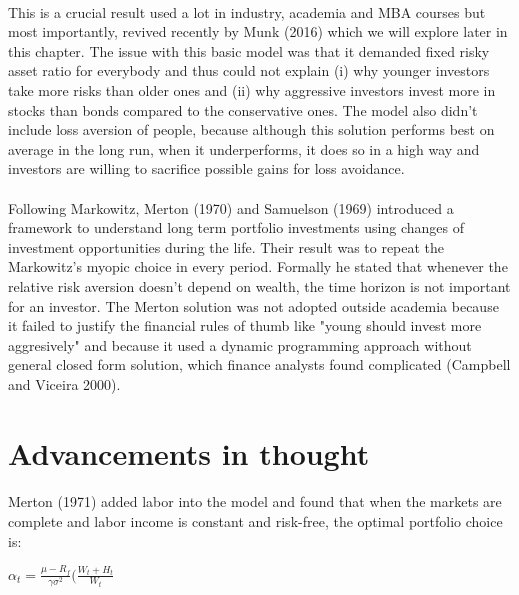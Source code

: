 \paragraph*{}This is a crucial result used a lot in industry, academia and MBA courses but most importantly, revived recently by Munk (2016) which we will explore later in this chapter. The issue with this basic model was that it demanded fixed risky asset ratio for everybody and thus could not explain (i) why younger investors take more risks than older ones and (ii) why aggressive investors invest more in stocks than bonds compared to the conservative ones. The model also didn't include loss aversion of people, because although this solution performs best on average in the long run, when it underperforms, it does so in a high way and investors are willing to sacrifice possible gains for loss avoidance.

 \paragraph*{}Following Markowitz, Merton (1970) and Samuelson (1969) introduced a framework to understand long term portfolio investments using changes of investment opportunities during the life. Their result was to repeat the Markowitz's myopic choice in every period. Formally he stated that whenever the relative risk aversion doesn't depend on wealth, the time horizon is not important for an investor. The Merton solution was not adopted outside academia because it failed to justify the financial rules of thumb like "young should invest more aggresively" and because it used a dynamic programming approach without general closed form solution, which finance analysts found complicated (Campbell and Viceira 2000).



\section{Advancements in thought}

\paragraph*{}Merton (1971) added labor into the model and found that when the markets are complete and labor income is constant and risk-free, the optimal portfolio choice is:

\begin{center}
	$\alpha_t = \frac{\mu - R_f}{\gamma \sigma^2}(\frac{W_t + H_t}{W_t}$
\end{center}

